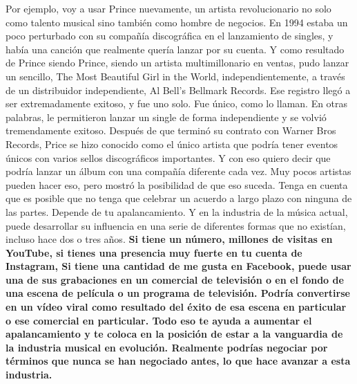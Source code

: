 \documentclass[10pt]{book}
\begin{document}
Por ejemplo, voy a usar Prince nuevamente, un artista revolucionario no solo como talento musical sino también como hombre de negocios. En 1994 estaba un poco perturbado con su compañía discográfica en el lanzamiento de singles, y había una canción que realmente quería lanzar por su cuenta. Y como resultado de Prince siendo Prince, siendo un artista multimillonario en ventas, pudo lanzar un sencillo, The Most Beautiful Girl in the World, independientemente, a través de un distribuidor independiente, Al Bell's Bellmark Records. Ese registro llegó a ser extremadamente exitoso, y fue uno solo. Fue único, como lo llaman. En otras palabras, le permitieron lanzar un single de forma independiente y se volvió tremendamente exitoso. Después de que terminó su contrato con Warner Bros Records, Price se hizo conocido como el único artista que podría tener eventos únicos con varios sellos discográficos importantes. Y con eso quiero decir que podría lanzar un álbum con una compañía diferente cada vez. Muy pocos artistas pueden hacer eso, pero mostró la posibilidad de que eso suceda. Tenga en cuenta que es posible que no tenga que celebrar un acuerdo a largo plazo con ninguna de las partes. Depende de tu apalancamiento. Y en la industria de la música actual, puede desarrollar su influencia en una serie de diferentes formas que no existían, incluso hace dos o tres años. \textbf{Si tiene un número, millones de visitas en YouTube, si tienes una presencia muy fuerte en tu cuenta de Instagram, Si tiene una cantidad de me gusta en Facebook, puede usar una de sus grabaciones en un comercial de televisión o en el fondo de una escena de película o un programa de televisión. Podría convertirse en un vídeo viral como resultado del éxito de esa escena en particular o ese comercial en particular. Todo eso te ayuda a aumentar el apalancamiento y te coloca en la posición de estar a la vanguardia de la industria musical en evolución. Realmente podrías negociar por términos que nunca se han negociado antes, lo que hace avanzar a esta industria.}
\end{document}

